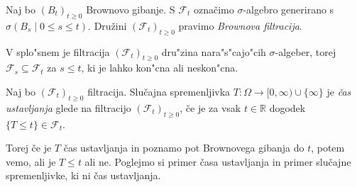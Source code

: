 \documentclass[twoside,11pt]{article}
\begin{document}

\begin{definicija}
    Naj bo $(B_t)_{t\geq 0}$ Brownovo gibanje. S $\mathcal{F}_t$ 
    označimo $\sigma$-algebro generirano s $\sigma(B_s \mid 0\leq s \leq t)$. 
    Družini $(\mathcal{F}_t)_{t\geq 0}$ pravimo \textit{Brownova filtracija}.
\end{definicija}

\begin{opomba}
    V splo"snem je filtracija $(\mathcal{F}_t)_{t\geq0}$ dru"zina nara"s"cajo"cih $\sigma$-algeber, torej $\mathcal{F}_s \subseteq \mathcal{F}_t$ za $s \leq t$, ki je lahko kon"cna ali neskon"cna.
\end{opomba}

%

\begin{definicija}
    Naj bo $(\mathcal{F}_t)_{t\geq0}$ filtracija. Slučajna spremenljivka $T: \Omega \rightarrow [0, \infty)\cup \{\infty\}$ 
    je \textit{čas ustavljanja} glede na filtracijo $(\mathcal{F}_t)_{t\geq0}$, če je za vsak $t \in \mathbb{R}$ dogodek $\{T \leq t\} \in \mathcal{F}_t$.
\end{definicija}

Torej če je $T$ čas ustavljanja in poznamo pot Brownovega gibanja do $t$, potem vemo, 
ali je $T\leq t$ ali ne. Poglejmo si primer časa ustavljanja in primer slučajne spremenljivke, 
ki ni čas ustavljanja.
\end{document}
